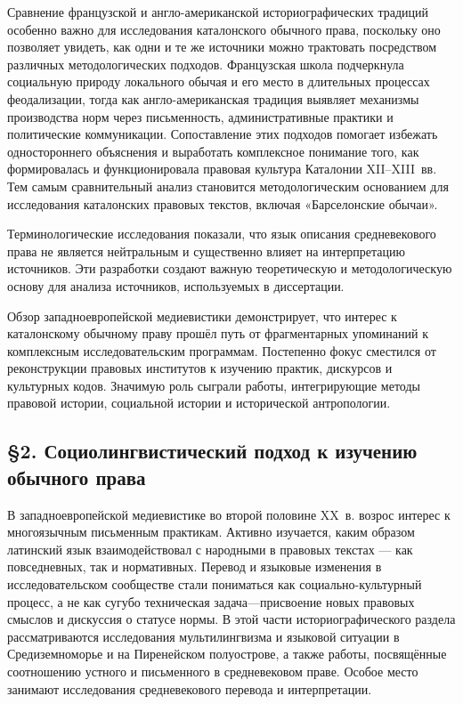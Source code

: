 Сравнение французской и англо-американской историографических традиций особенно важно для исследования каталонского обычного права, поскольку оно позволяет увидеть, как одни и те же источники можно трактовать посредством различных методологических подходов. Французская школа подчеркнула социальную природу локального обычая и его место в длительных процессах феодализации, тогда как англо-американская традиция выявляет механизмы производства норм через письменность, административные практики и политические коммуникации. Сопоставление этих подходов помогает избежать одностороннего объяснения и выработать комплексное понимание того, как формировалась и функционировала правовая культура Каталонии XII--XIII~вв. Тем самым сравнительный анализ становится методологическим основанием для исследования каталонских правовых текстов, включая «Барселонские обычаи».

Терминологические исследования показали, что язык описания средневекового права не является нейтральным и существенно влияет на интерпретацию источников. Эти разработки создают важную теоретическую и методологическую основу для анализа источников, используемых в диссертации.

Обзор западноевропейской медиевистики демонстрирует, что интерес к каталонскому обычному праву прошёл путь от фрагментарных упоминаний к комплексным исследовательским программам. Постепенно фокус сместился от реконструкции правовых институтов к изучению практик, дискурсов и культурных кодов. Значимую роль сыграли работы, интегрирующие методы правовой истории, социальной истории и исторической антропологии.

\subsection*{§2. Социолингвистический подход к изучению обычного права}

В западноевропейской медиевистике во второй половине XX~в. возрос интерес к многоязычным письменным практикам. Активно изучается, каким образом латинский язык взаимодействовал с народными в правовых текстах --- как повседневных, так и нормативных. Перевод и языковые изменения в исследовательском сообществе стали пониматься как социально-культурный процесс, а не как сугубо техническая задача---присвоение новых правовых смыслов и дискуссия о статусе нормы. В этой части историографического раздела рассматриваются исследования мультилингвизма и языковой ситуации в Средиземноморье и на Пиренейском полуострове, а также работы, посвящённые соотношению устного и письменного в средневековом праве. Особое место занимают исследования средневекового перевода и интерпретации.

